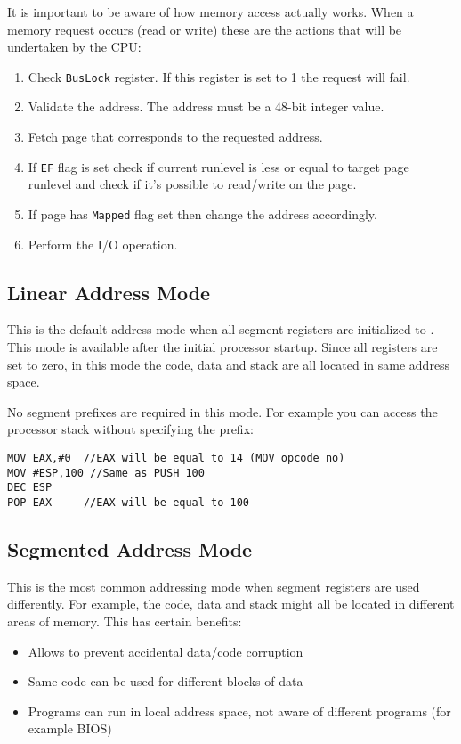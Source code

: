It is important to be aware of how memory access actually works. When a memory request occurs (read or write) these are the actions that will be undertaken by the CPU:

\begin{enumerate}
	\item Check \texttt{BusLock} register. If this register is set to 1 the request will fail.
	\item Validate the address. The address must be a 48-bit integer value.
	\item Fetch page that corresponds to the requested address.
	\item If \texttt{EF} flag is set check if current runlevel is less or equal to target page runlevel and check if it's possible to read/write on the page.
	\item If page has \texttt{Mapped} flag set then change the address accordingly.
	\item Perform the I/O operation.
\end{enumerate}

\subsection{Linear Address Mode}
This is the default address mode when all segment registers are initialized to . This mode is available after the initial processor startup. Since all registers are set to zero, in this mode the code, data and stack are all located in same address space. 

No segment prefixes are required in this mode. For example you can access the processor stack without specifying the  prefix:

\begin{verbatim}
MOV EAX,#0  //EAX will be equal to 14 (MOV opcode no)
MOV #ESP,100 //Same as PUSH 100
DEC ESP
POP EAX     //EAX will be equal to 100
\end{verbatim}

\subsection{Segmented Address Mode}
This is the most common addressing mode when segment registers are used differently. For example, the code, data and stack might all be located in different areas of memory. This has certain benefits:

\begin{itemize}
  \item Allows to prevent accidental data/code corruption
  \item Same code can be used for different blocks of data
  \item Programs can run in local address space, not aware of different programs (for example BIOS)
\end{itemize}

